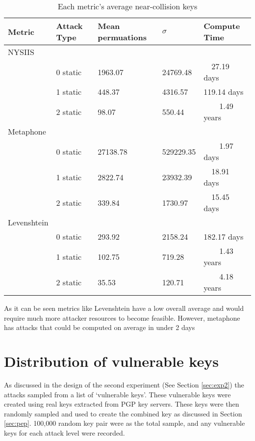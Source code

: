 \begin{table}[!h]
    \centering
    \begin{tabular}{|lllll|}
        \hline
        \textbf{Metric} & \textbf{Attack Type} & \textbf{Mean permuations} & \textbf{$\sigma$} & \textbf{Compute Time} \\
        \hline
        NYSIIS &&&& \\
        \hline
        & 0 static & 1963.07 & 24769.48 & ~~27.19 days \\
        & 1 static & 448.37 & 4316.57 & 119.14 days \\
        & 2 static & 98.07 & 550.44 & ~~~~1.49 years \\
        \hline

        Metaphone &&&& \\
        \hline
        & 0 static & 27138.78 & 529229.35 & ~~~~1.97 days \\
        & 1 static & 2822.74 & 23932.39 & ~~18.91 days \\
        & 2 static & 339.84 & 1730.97 & ~~15.45 days \\
        \hline

        Levenshtein &&&& \\
        \hline
        & 0 static & 293.92 & 2158.24 & 182.17 days \\
        & 1 static & 102.75 & 719.28 & ~~~~1.43 years \\
        & 2 static & 35.53 & 120.71 & ~~~~4.18 years \\
        \hline

    \end{tabular}
    \caption{Each metric's average near-collision keys}
    \label{tab:average_perm}
\end{table}

As it can be seen metrics like Levenshtein have a low overall average and would require much more attacker resources to become feasible. However, metaphone has attacks that could be computed on average in under 2 days

\section{Distribution of vulnerable keys}
As discussed in the design of the second experiment (See Section \ref{sec:exp2}) the attacks sampled from a list of `vulnerable keys'. These vulnerable keys were created using real keys extracted from PGP key servers. These keys were then randomly sampled and used to create the combined key as discussed in Section \ref{sec:pep}. 100,000 random key pair were as the total sample, and any vulnerable keys for each attack level were recorded.

